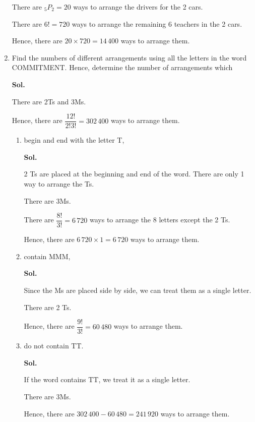 \documentclass{report}
\newcommand\permtwo[2][^n]{{}_{#1}P_{#2}}
\newcommand{\sol}[1]{

      \noindent \textbf{Sol.}
}
\def\eos{\quad\hbox{\rlap{\hbox{\vrule depth 1.5pt height 2.6mm width 0.2mm \hskip 1mm \vrule height 2.6mm width 0.2mm}}{\vbox{\hrule height 0.2mm width 1.4mm \vskip 2.8mm \hrule depth 1.5pt height -0.35mm width 1.2mm}}}}
\begin{document}
\begin{multicols*}{2}
\begin{enumerate}
                  There are $\permtwo[5]{2} = 20$ ways to arrange the drivers for the 2 cars.

                  There are $6! = 720$ ways to arrange the remaining 6 teachers in the 2 cars.

                  Hence, there are $20 \times 720 = 14\,400$ ways to arrange them. $\eos$

            \item Find the numbers of different arrangements using all the letters in the word
                  COMMITMENT. Hence, determine the number of arrangements which \sol{}

                  There are 2Ts and 3Ms.

                  Hence, there are $\dfrac{12!}{2!3!} = 302\,400$ ways to arrange them. $\eos$

                  \begin{enumerate}
                        \item begin and end with the letter T, \sol{}

                              2 Ts are placed at the beginning and end of the word. There are only 1 way to arrange the Ts.

                              There are 3Ms.

                              There are $\dfrac{8!}{3!} = 6\,720$ ways to arrange the 8 letters except the 2
                              Ts.

                              Hence, there are $6\,720 \times 1 = 6\,720$ ways to arrange them. $\eos$

                        \item contain MMM, \sol{}

                              Since the Ms are placed side by side, we can treat them as a single letter.

                              There are 2 Ts.

                              Hence, there are $\dfrac{9!}{3!} = 60\,480$ ways to arrange them. $\eos$

                        \item do not contain TT. \sol{}

                              If the word contains TT, we treat it as a single letter.

                              There are 3Ms.

                              Hence, there are $302\,400 - 60\,480 = 241\,920$ ways to arrange them. $\eos$
                  \end{enumerate}


\end{enumerate}
\end{multicols*}
\end{document}
